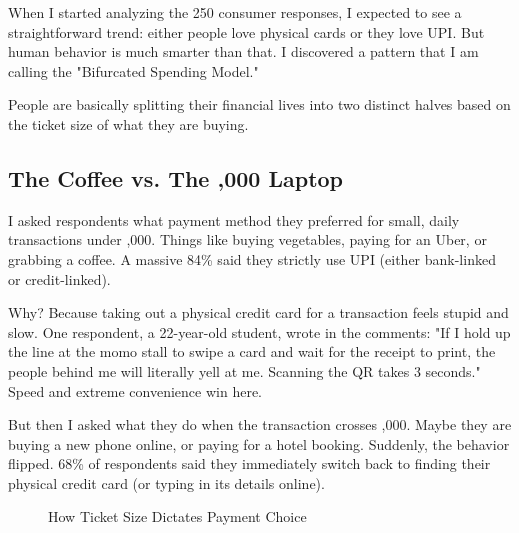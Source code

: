 When I started analyzing the 250 consumer responses, I expected to see a straightforward trend: either people love physical cards or they love UPI. But human behavior is much smarter than that. I discovered a pattern that I am calling the "Bifurcated Spending Model."

People are basically splitting their financial lives into two distinct halves based on the ticket size of what they are buying.

\subsection{The  Coffee vs. The ,000 Laptop}

I asked respondents what payment method they preferred for small, daily transactions under ,000. Things like buying vegetables, paying for an Uber, or grabbing a coffee. A massive 84\% said they strictly use UPI (either bank-linked or credit-linked).

Why? Because taking out a physical credit card for a  transaction feels stupid and slow. One respondent, a 22-year-old student, wrote in the comments: "If I hold up the line at the momo stall to swipe a card and wait for the receipt to print, the people behind me will literally yell at me. Scanning the QR takes 3 seconds." Speed and extreme convenience win here.

But then I asked what they do when the transaction crosses ,000. Maybe they are buying a new phone online, or paying for a hotel booking. Suddenly, the behavior flipped. 68\% of respondents said they immediately switch back to finding their physical credit card (or typing in its details online).

\begin{figure}[H]
\centering
{}
\caption{How Ticket Size Dictates Payment Choice}
\label{fig:ticket_size_behavior}
\end{figure}

